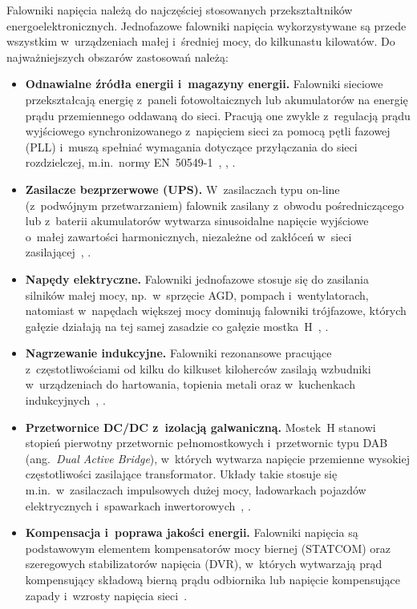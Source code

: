 Falowniki napięcia należą do najczęściej stosowanych przekształtników
energoelektronicznych. Jednofazowe falowniki napięcia wykorzystywane są
przede wszystkim w~urządzeniach małej i~średniej mocy, do kilkunastu
kilowatów. Do najważniejszych obszarów zastosowań należą:
\begin{itemize}
  \item \textbf{Odnawialne źródła energii i~magazyny energii.} Falowniki
    sieciowe przekształcają energię z~paneli fotowoltaicznych lub
    akumulatorów na energię prądu przemiennego oddawaną do sieci. Pracują
    one zwykle z~regulacją prądu wyjściowego synchronizowanego z~napięciem
    sieci za pomocą pętli fazowej (PLL) i~muszą spełniać wymagania
    dotyczące przyłączania do sieci rozdzielczej, m.in.~normy
    EN~50549-1~\cite[s.~252--253]{mohan2012}, \cite[s.~16--17]{instrukcja},
    \cite{en50549}.
  \item \textbf{Zasilacze bezprzerwowe (UPS).} W~zasilaczach typu on-line
    (z~podwójnym przetwarzaniem) falownik zasilany z~obwodu pośredniczącego
    lub z~baterii akumulatorów wytwarza sinusoidalne napięcie wyjściowe
    o~małej zawartości harmonicznych, niezależne od zakłóceń w~sieci
    zasilającej~\cite[s.~184--185, 256]{mohan2012}, \cite{iec62040}.
  \item \textbf{Napędy elektryczne.} Falowniki jednofazowe stosuje się do
    zasilania silników małej mocy, np.~w~sprzęcie AGD, pompach
    i~wentylatorach, natomiast w~napędach większej mocy dominują falowniki
    trójfazowe, których gałęzie działają na tej samej zasadzie co gałęzie
    mostka~H~\cite[s.~172--184]{mohan2012}, \cite[s.~3]{instrukcja}.
  \item \textbf{Nagrzewanie indukcyjne.} Falowniki rezonansowe pracujące
    z~częstotliwościami od kilku do kilkuset kiloherców zasilają wzbudniki
    w~urządzeniach do hartowania, topienia metali oraz w~kuchenkach
    indukcyjnych~\cite[s.~169]{mohan2012}, \cite{lucia2014}.
  \item \textbf{Przetwornice DC/DC z~izolacją galwaniczną.} Mostek~H stanowi
    stopień pierwotny przetwornic pełnomostkowych i~przetwornic typu DAB
    (ang.~\textit{Dual Active Bridge}), w~których wytwarza napięcie
    przemienne wysokiej częstotliwości zasilające transformator. Układy
    takie stosuje się m.in.~w~zasilaczach impulsowych dużej mocy,
    ładowarkach pojazdów elektrycznych i~spawarkach
    inwertorowych~\cite[s.~148--152]{mohan2012}, \cite[s.~15--17]{instrukcja}.
  \item \textbf{Kompensacja i~poprawa jakości energii.} Falowniki napięcia
    są podstawowym elementem kompensatorów mocy biernej (STATCOM) oraz
    szeregowych stabilizatorów napięcia (DVR), w~których wytwarzają prąd
    kompensujący składową bierną prądu odbiornika lub napięcie kompensujące
    zapady i~wzrosty napięcia sieci~\cite[s.~185, 256, 259]{mohan2012}.
\end{itemize}

